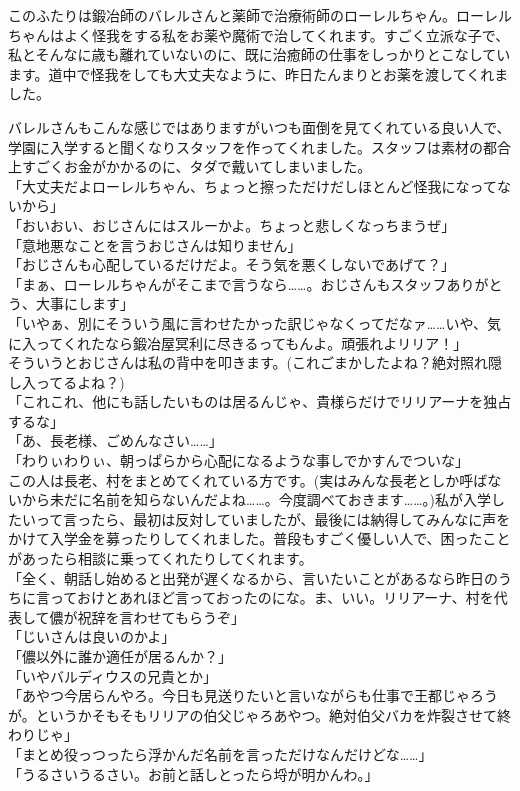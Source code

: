 \documentclass[oneside, a4paper]{jsbook}
\begin{document}
このふたりは鍛冶師のバレルさんと薬師で治療術師のローレルちゃん。ローレルちゃんはよく怪我をする私をお薬や魔術で治してくれます。すごく立派な子で、私とそんなに歳も離れていないのに、既に治癒師の仕事をしっかりとこなしています。道中で怪我をしても大丈夫なように、昨日たんまりとお薬を渡してくれました。

バレルさんもこんな感じではありますがいつも面倒を見てくれている良い人で、学園に入学すると聞くなりスタッフを作ってくれました。スタッフは素材の都合上すごくお金がかかるのに、タダで戴いてしまいました。\\

\noindent
「大丈夫だよローレルちゃん、ちょっと擦っただけだしほとんど怪我になってないから」\\
「おいおい、おじさんにはスルーかよ。ちょっと悲しくなっちまうぜ」\\
「意地悪なことを言うおじさんは知りません」\\
「おじさんも心配しているだけだよ。そう気を悪くしないであげて？」\\
「まぁ、ローレルちゃんがそこまで言うなら……。おじさんもスタッフありがとう、大事にします」\\
「いやぁ、別にそういう風に言わせたかった訳じゃなくってだなァ……いや、気に入ってくれたなら鍛冶屋冥利に尽きるってもんよ。頑張れよリリア！」\\

そういうとおじさんは私の背中を叩きます。(これごまかしたよね？絶対照れ隠し入ってるよね？)\\

\noindent
「これこれ、他にも話したいものは居るんじゃ、貴様らだけでリリアーナを独占するな」\\
「あ、長老様、ごめんなさい……」\\
「わりぃわりぃ、朝っぱらから心配になるような事しでかすんでついな」\\

この人は長老、村をまとめてくれている方です。(実はみんな長老としか呼ばないから未だに名前を知らないんだよね……。今度調べておきます……。)私が入学したいって言ったら、最初は反対していましたが、最後には納得してみんなに声をかけて入学金を募ったりしてくれました。普段もすごく優しい人で、困ったことがあったら相談に乗ってくれたりしてくれます。\\

\noindent
「全く、朝話し始めると出発が遅くなるから、言いたいことがあるなら昨日のうちに言っておけとあれほど言っておったのにな。ま、いい。リリアーナ、村を代表して儂が祝辞を言わせてもらうぞ」\\
「じいさんは良いのかよ」\\
「儂以外に誰か適任が居るんか？」\\
「いやバルディウスの兄貴とか」\\
「あやつ今居らんやろ。今日も見送りたいと言いながらも仕事で王都じゃろうが。というかそもそもリリアの伯父じゃろあやつ。絶対伯父バカを炸裂させて終わりじゃ」\\
「まとめ役っつったら浮かんだ名前を言っただけなんだけどな……」\\
「うるさいうるさい。お前と話しとったら埒が明かんわ。」\\
\end{document}
